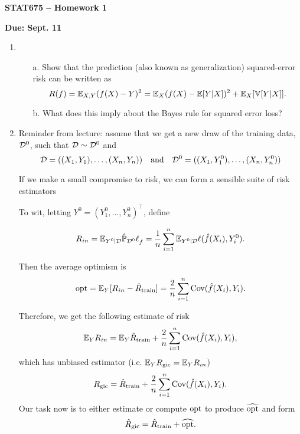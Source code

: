 \documentclass[11pt]{article}
\begin{document}
\baselineskip=13.2pt
\parindent=0pt
\parskip=13.2pt
\pagestyle{empty}

\newcommand{\sd}{\textrm{sd}}

\centerline{\bf \Large STAT675 -- Homework 1}
\centerline{\bf \large Due: Sept. 11} 
\begin{enumerate}
\item 
\begin{itemize}
\item[a.] Show that the prediction (also known as generalization) squared-error risk can be written as
\begin{equation}
R(f) = \mathbb{E}_{X,Y} (f(X) - Y)^2 = \mathbb{E}_X (f(X) - \mathbb{E}[Y|X])^2 + \mathbb{E}_X[\mathbb{V}[Y|X]].
\label{eq:bayes}
\end{equation}
\item[b.] What does this imply about the Bayes rule for squared error loss?
\end{itemize}
\newpage
\item Reminder from lecture:
assume that we get a new draw of the training data, $\mathcal{D}^0$, such that $\mathcal{D} \sim \mathcal{D}^0$ and
\[
\mathcal{D} = ((X_1,Y_1), \ldots, (X_n,Y_n)) \quad \textrm{and} \quad \mathcal{D}^0 = ((X_1,Y_1^0), \ldots, (X_n,Y_n^0))
\]


If we make a small compromise to risk, we can form a sensible suite of risk estimators


To wit, letting $Y^0 = (Y_1^0,\ldots,Y_n^0)^{\top}$, define 

\[
R_{in} = \mathbb{E}_{Y^0 | \mathcal{D}}  \hat{\mathbb{P}}_{\mathcal{D}^0}  \ell_{\hat{f}}= \frac{1}{n} \sum_{i=1}^n \mathbb{E}_{Y^0 | \mathcal{D}} \ell(\hat{f}(X_i),Y_i^0).
\]


Then the average optimism is
\[
\textrm{opt} = \mathbb{E}_Y [ R_{in} - \hat{R}_{\textrm{train}}]= \frac{2}{n} \sum_{i=1}^n \textrm{Cov}(\hat f(X_i),Y_i).
\]


Therefore, we get the following estimate of risk
\[
 \mathbb{E}_Y R_{in} = \mathbb{E}_Y \hat{R}_{\textrm{train}} + \frac{2}{n} \sum_{i=1}^n \textrm{Cov}(\hat f(X_i),Y_i),
\]
which has unbiased estimator (i.e. $\mathbb{E}_Y R_{\textrm{gic}} =  \mathbb{E}_Y R_{in}$)
\[
R_{\textrm{gic}} = \hat{R}_{\textrm{train}} + \frac{2}{n} \sum_{i=1}^n \textrm{Cov}(\hat f(X_i),Y_i).
\]
Our task now is to either estimate or compute $\textrm{opt}$ to produce $\widehat{\textrm{opt}}$ and form
\begin{equation}
\hat{R}_{\textrm{gic}} = \hat{R}_{\textrm{train}} + \widehat{\textrm{opt}}.
\label{eq:gic}
\end{equation}




\end{enumerate}
\end{document}
